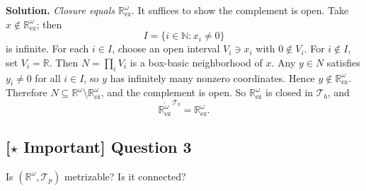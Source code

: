 \documentclass{article}
\newcommand{\R}{\mathbb{R}}
\newcommand{\N}{\mathbb{N}}
\newcommand{\important}{\texorpdfstring{\textbf{[\(\star\) Important]}}{[Important]}}
\newenvironment{solution}{\par\noindent\textbf{Solution.}\quad}{\par}
\begin{document}
\begin{solution}
  \emph{Closure equals $\R^\omega_{\mathrm{ez}}$.}
  It suffices to show the complement is open.
  Take $x\notin \R^\omega_{\mathrm{ez}}$; then
  \[
    I=\{i\in\N: x_i\ne 0\}
  \]
  is infinite.
  For each $i\in I$, choose an open interval $V_i\ni x_i$ with $0\notin V_i$.
  For $i\notin I$, set $V_i=\R$.
  Then $N=\prod_i V_i$ is a box-basic neighborhood of $x$.
  Any $y\in N$ satisfies $y_i\ne 0$ for all $i\in I$, so $y$ has
  infinitely many nonzero coordinates.
  Hence $y\notin \R^\omega_{\mathrm{ez}}$.
  Therefore $N\subseteq \R^\omega\setminus \R^\omega_{\mathrm{ez}}$,
  and the complement is open.
  So $\R^\omega_{\mathrm{ez}}$ is closed in $\mathcal{T}_b$, and
  \[
    \overline{\R^\omega_{\mathrm{ez}}}^{\,\mathcal{T}_b}=\R^\omega_{\mathrm{ez}}.
  \]
\end{solution}

\subsection{\important{} Question 3}

Is $(\R^\omega,\mathcal{T}_p)$ metrizable? Is it connected?
\end{document}
